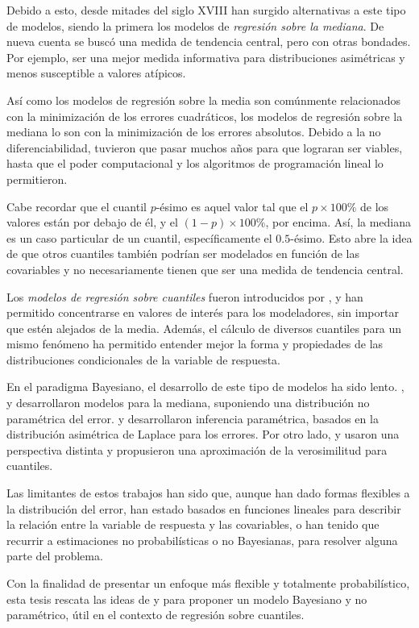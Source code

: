 Debido a esto, desde mitades del siglo XVIII han surgido alternativas a este tipo de modelos, siendo la primera los modelos de \textit{regresi\'on sobre la mediana}. De nueva cuenta se busc\'o una medida de tendencia central, pero con otras bondades. Por ejemplo, ser una mejor medida informativa para distribuciones asim\'etricas y menos susceptible a valores at\'ipicos. 

As\'i como los modelos de regresi\'on sobre la media son com\'unmente relacionados con la minimizaci\'on de los errores cuadr\'aticos, los modelos de regresi\'on sobre la mediana lo son con la minimizaci\'on de los errores absolutos. Debido a la no diferenciabilidad, tuvieron que pasar muchos años para que lograran ser viables, hasta que el poder computacional y los algoritmos de programaci\'on lineal lo permitieron.

Cabe recordar que el cuantil $p$-\'esimo es aquel valor tal que el $p \times 100\%$ de los valores est\'an por debajo de \'el, y el $(1-p)\times 100\%$, por encima. As\'i, la mediana es un caso particular de un cuantil, espec\'ificamente el $0.5$-\'esimo. Esto abre la idea de que otros cuantiles tambi\'en podr\'ian ser modelados en funci\'on de las covariables y no necesariamente tienen que ser una medida de tendencia central. 

Los \textit{modelos de regresi\'on sobre cuantiles} fueron introducidos por \cite{Koenker_QuantReg}, y han permitido concentrarse en valores de inter\'es para los modeladores, sin importar que est\'en alejados de la media. Adem\'as, el c\'alculo de diversos cuantiles para un mismo fen\'omeno ha permitido entender mejor la forma y propiedades de las distribuciones condicionales de la variable de respuesta.

En el paradigma Bayesiano, el desarrollo de este tipo de modelos ha sido lento. \cite{Walker_BayesAccFail}, \cite{Kottas_BaySemiparamMed} y \cite{Hanson_PolyaTrees} desarrollaron modelos para la mediana, suponiendo una distribuci\'on no param\'etrica del error. \cite{Yu_BayQuantReg} y \cite{Tsionas_BayQuantInf} desarrollaron inferencia param\'etrica, basados en la distribuci\'on asim\'etrica de Laplace para los errores. Por otro lado, \cite{Lavine_LikeQuant} y \cite{Dunson_ApproxBayes} usaron una perspectiva distinta y propusieron una aproximaci\'on de la verosimilitud para cuantiles.

Las limitantes de estos trabajos han sido que, aunque han dado formas flexibles a la distribuci\'on del error, han estado basados en funciones lineales para describir la relaci\'on entre la variable de respuesta y las covariables, o han tenido que recurrir a estimaciones no probabil\'isticas o no Bayesianas, para resolver alguna parte del problema.

Con la finalidad de presentar un enfoque m\'as flexible y totalmente probabil\'istico, esta tesis rescata las ideas de \cite{Kottas_NotParamQuantReg} y \cite{Kottas_SemiparamQuantReg} para proponer un modelo Bayesiano y no param\'etrico, \'util en el contexto de regresi\'on sobre cuantiles.

\newpage